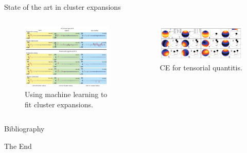 \documentclass[aspectratio=169]{beamer}
\begin{document}
    \begin{frame}{State of the art in cluster expansions}

        \begin{columns}
            \begin{figure}
                \centering
                \includegraphics[width=\linewidth]{lectures/figures/10_compressive_sensing.png}
                \caption{Using machine learning to fit cluster expansions.\cite{nelsonCompressiveSensingParadigm2013}}
            \end{figure}
            \begin{figure}
                \centering
                \includegraphics[width=\linewidth]{lectures/figures/10_tensorial_CE.png}
                \caption{CE for tensorial quantitis.\cite{vandewalleCompleteRepresentationStructureproperty2008}}
            \end{figure}
        \end{columns}

    \end{frame}

    \begin{frame}[allowframebreaks]{Bibliography}
        
        
    \end{frame}



    \begin{frame}
        \Huge{\centerline{The End}}
    \end{frame}
\end{document}
